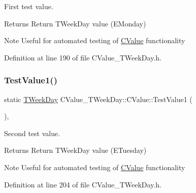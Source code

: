 First test value. 

\begin{DoxyReturn}{Returns}
Return T\+Week\+Day value (E\+Monday) 
\end{DoxyReturn}
\begin{DoxyNote}{Note}
Useful for automated testing of \hyperlink{class_c_value___t_week_day_1_1_c_value}{C\+Value} functionality 
\end{DoxyNote}


Definition at line 190 of file C\+Value\+\_\+\+T\+Week\+Day.\+h.

\mbox{\label{class_c_value___t_week_day_1_1_c_value_a8841fa6df3e84da037d9d34cc87a2581}} 
\subsubsection{\texorpdfstring{Test\+Value1()}{TestValue1()}}
{\footnotesize\ttfamily static \hyperlink{namespace_c_value___t_week_day_a6412f204509f223b789fb5f1a61a6124}{T\+Week\+Day} C\+Value\+\_\+\+T\+Week\+Day\+::\+C\+Value\+::\+Test\+Value1 (\begin{DoxyParamCaption}{ }\end{DoxyParamCaption})\hspace{0.3cm}{\ttfamily [inline]}, {\ttfamily [static]}}



Second test value. 

\begin{DoxyReturn}{Returns}
Return T\+Week\+Day value (E\+Tuesday) 
\end{DoxyReturn}
\begin{DoxyNote}{Note}
Useful for automated testing of \hyperlink{class_c_value___t_week_day_1_1_c_value}{C\+Value} functionality 
\end{DoxyNote}


Definition at line 204 of file C\+Value\+\_\+\+T\+Week\+Day.\+h.

\mbox{\label{class_c_value___t_week_day_1_1_c_value_a4d63e74d431ec7af57711f39ab703a8c}} 
